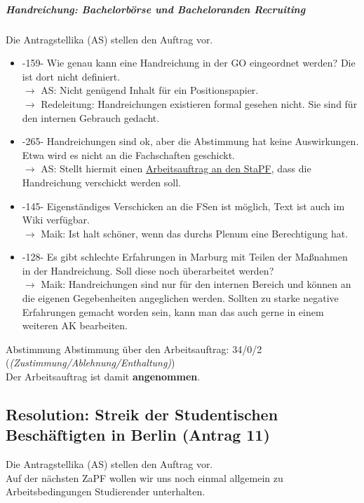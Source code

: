   \subparagraph{Handreichung: Bachelorbörse und Bacheloranden Recruiting}
    Die Antragstellika (AS) stellen den Auftrag vor.

    \begin{itemize}
      \item -159- Wie genau kann eine Handreichung in der GO eingeordnet werden? Die ist dort nicht definiert. \\
        $\rightarrow$ AS: Nicht genügend Inhalt für ein Positionspapier. \\
        $\rightarrow$ Redeleitung: Handreichungen existieren formal gesehen nicht. Sie sind für den internen Gebrauch gedacht.
      \item -265- Handreichungen sind ok, aber die Abstimmung hat keine Auswirkungen. Etwa wird es nicht an die Fachschaften geschickt. \\
        $\rightarrow$ AS: Stellt hiermit einen \underline{Arbeitsauftrag an den StaPF}, dass die Handreichung verschickt werden soll.
      \item -145- Eigenständiges Verschicken an die FSen ist möglich, Text ist auch im Wiki verfügbar. \\
        $\rightarrow$ Maik: Ist halt schöner, wenn das durchs Plenum eine Berechtigung hat.
      \item -128- Es gibt schlechte Erfahrungen in Marburg mit Teilen der Maßnahmen in der Handreichung. Soll diese noch überarbeitet werden? \\
        $\rightarrow$ Maik: Handreichungen sind nur für den internen Bereich und können an die eigenen Gegebenheiten angeglichen werden. Sollten zu starke negative Erfahrungen gemacht worden sein, kann man das auch gerne in einem weiteren AK bearbeiten.
    \end{itemize}

    \begin{success}{Abstimmung}
      Abstimmung über den Arbeitsauftrag: 34/0/2 (\textit{(Zustimmung/Ablehnung/Enthaltung)}) \\
      Der Arbeitsauftrag ist damit \textbf{angenommen}.
    \end{success}

  \subsection{Resolution: Streik der Studentischen Beschäftigten in Berlin (Antrag 11)}
    Die Antragstellika (AS) stellen den Auftrag vor. \\
    Auf der nächsten ZaPF wollen wir uns noch einmal allgemein zu Arbeitsbedingungen Studierender unterhalten.

